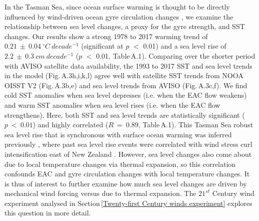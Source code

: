 \documentclass[draft,linenumbers]{agujournal2018}
\begin{document}
In the Tasman Sea, since ocean surface warming is thought to be directly influenced by wind-driven ocean gyre circulation changes \citep{Hill2011,Oliver2014,Ridgway2007b,Roemmich2007,Wu2012}, we examine the relationship between sea level changes, a proxy for the gyre strength, and SST changes. Our results show a strong 1978 to 2017 warming trend of $0.21\ \pm\ 0.04\ ^{\circ}C\ decade^{-1}$ (significant at $p$ $<$ 0.01) and a sea level rise of $2.2\ \pm\ 0.3\ cm\ decade^{-1}$ ($p$ $<$ 0.01, Table\,A.1). Comparing over the shorter period with AVISO satellite data availability, the 1993 to 2017 SST and sea level trends in the model (Fig.\,A.3h,i,k,l) agree well with satellite SST trends from NOOA OISST V2 (Fig.\,A.3b,e) and sea level trends from AVISO (Fig.\,A.3c,f). We find cold SST anomalies when sea level depresses (i.e. when the EAC flow weakens) and warm SST anomalies when sea level rises (i.e. when the EAC flow strengthens). Here, both SST and sea level trends are statistically significant ($p\ <\ 0.01$) and highly correlated ($R\ =\ 0.89$, Table\,A.1). This Tasman Sea robust sea level rise that is synchronous with surface ocean warming was inferred previously \citep{Holbrook1997}, where past sea level rise events were correlated with wind stress curl intensification east of New Zealand \citep{Roemmich2007}. However, sea level changes also come about due to local temperature changes via thermal expansion, so this correlation confounds EAC and gyre circulation changes with local temperature changes. It is thus of interest to further examine how much sea level changes are driven by mechanical wind forcing versus due to thermal expansion. The $21^{st}$ Century wind experiment analysed in Section\,\ref{Twenty-first Century winds experiment} explores this question in more detail.
\end{document}
